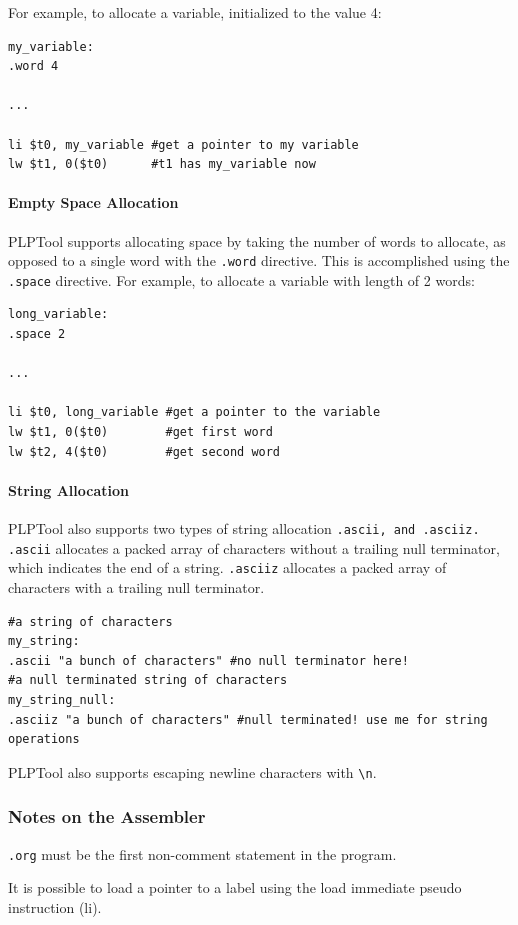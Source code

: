 \documentclass{article}
\begin{document}
For example, to allocate a variable, initialized to the value 4: 

\begin{verbatim}
my_variable:
.word 4

...

li $t0, my_variable #get a pointer to my variable
lw $t1, 0($t0)      #t1 has my_variable now
\end{verbatim}

\paragraph{Empty Space Allocation}
PLPTool supports allocating space by taking the number of words to allocate, 
as opposed to a single word with the \verb+.word+ directive. This is 
accomplished using the \verb+.space+ directive. For example, to allocate a 
variable with length of 2 words: 

\begin{verbatim}
long_variable:
.space 2

...

li $t0, long_variable #get a pointer to the variable
lw $t1, 0($t0)        #get first word
lw $t2, 4($t0)        #get second word
\end{verbatim}

\paragraph{String Allocation}
PLPTool also supports two types of string allocation
\verb+.ascii, and .asciiz. .ascii+
allocates a packed array of characters without a trailing null 
terminator, which indicates the end of a string.
\verb+.asciiz+ allocates a packed array of characters with a trailing 
null terminator. 

\begin{verbatim}
#a string of characters
my_string:
.ascii "a bunch of characters" #no null terminator here!
#a null terminated string of characters
my_string_null:
.asciiz "a bunch of characters" #null terminated! use me for string operations
\end{verbatim}
PLPTool also supports escaping newline characters with \verb+\n+. 
\subsubsection{Notes on the Assembler}
\verb+.org+ must be the first non-comment statement in the program.

It is possible to load a pointer to a label using the load immediate pseudo instruction (li). 
\end{document}
